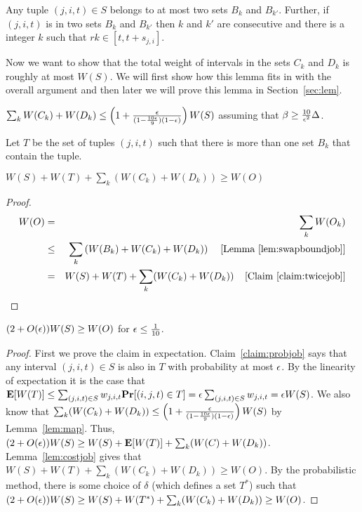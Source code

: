 \begin{claim}
\label{claim:twicejob}
Any tuple $(j,i,t) \in S$ belongs to at most two sets $B_k$ and $B_{k'}$.  Further, if $(j,i,t)$ is in two sets $B_k$ and $B_{k'}$ then $k$ and $k'$ are consecutive and there is a integer $k$ such that $rk \in [t,t+s_{j,i}]$.
\end{claim}




Now we want to show that the total weight of intervals in the sets $C_k$ and $D_k$ is roughly at most $W(S)$.  We will first show how this lemma fits in with the overall argument and then later we will prove this lemma in Section~\ref{sec:lem}.

\begin{lemma}
\label{lem:map}
$\sum_k W(C_k)+W(D_k) \leq \left (1 +  \frac{\epsilon}{(1-\frac{10\epsilon}{9})(1-\epsilon)} \right) W(S)$ assuming that $\beta \geq \frac{10}{\epsilon^2} \Delta$.
\end{lemma}







Let $T$ be the set of tuples $(j,i,t)$ such that there is more than one set $B_k$ that contain the tuple. 


\begin{lemma}
\label{lem:costjob}
$W(S) + W(T)  +\sum_k ( W(C_k)+W(D_k))  \geq W(O)$
\end{lemma}
\begin{proof}
\begin{eqnarray*}
W(O) &=& \sum_k W(O_k)\\
&\leq& \sum_k \left (W(B_k) + W(C_k) + W(D_k) \right) \;\;\;\; \mbox{[Lemma~\ref{lem:swapboundjob}]}\\
&=& W(S) + W(T) +     \sum_k (W(C_k)+ W(D_k))  \;\;\;\; \mbox{[Claim~\ref{claim:twicejob}]}
\end{eqnarray*}


\end{proof}

\begin{theorem}
$(2+O(\epsilon))W(S) \geq W(O)$ for $\epsilon \leq \frac{1}{10}$.
\end{theorem}
\begin{proof}

First we prove the claim in expectation.     Claim~\ref{claim:probjob} says that any interval $(j,i,t) \in S$ is also in $T$ with probability at most $\epsilon$.  By the linearity of expectation it is the case that $\textbf{E}[W(T)] \leq \sum_{(j,i,t) \in S} w_{j,i,t}\textbf{Pr}[(i,j,t) \in T] = \epsilon \sum_{(j,i,t) \in S} w_{j,i,t} = \epsilon W(S)$.  We also know that $\sum_k ( W(C_k)+W(D_k)) \leq  \left (1 +  \frac{\epsilon}{(1-\frac{10\epsilon}{9})(1-\epsilon)} \right) W(S)$ by Lemma~\ref{lem:map}.  Thus, $(2+O(\epsilon))W(S) \geq W(S) + \textbf{E}[W(T)] + \sum_k ( W(C)+W(D_k))$. Lemma~\ref{lem:costjob} gives that $W(S) + W(T) +\sum_k ( W(C_k)+W(D_k))  \geq W(O)$.  By  the probabilistic method, there is some choice of $\delta$ (which defines a set $T^*$) such that $(2+O(\epsilon))W(S) \geq W(S) + W(T^*) +\sum_k ( W(C_k)+W(D_k)) \geq W(O)$.

\end{proof}

